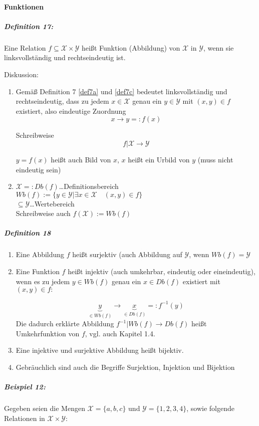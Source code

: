 \documentclass[a4paper]{scrartcl}
\begin{document}
\paragraph{Funktionen}
\subparagraph{Definition 17:} Eine Relation $f\subseteq \mathcal{X} \times \mathcal{Y}$ heißt Funktion (Abbildung) von $\mathcal{X}$ in $\mathcal{Y}$, wenn sie linksvollständig und rechtseindeutig ist.

Diskussion:
\begin{enumerate}
\item Gemäß Definition 7 \ref{def7a} und \ref{def7c} bedeutet linksvollständig und rechtseindeutig, dass zu jedem $x \in \mathcal{X}$ genau ein $y \in \mathcal{Y}$ mit $(x,y) \in f$ existiert, also eindeutige Zuordnung
\[x \rightarrow y =: f(x)\]

Schreibweise
\[ f| \mathcal{X} \rightarrow \mathcal{Y}\]

$y = f(x)$ heißt auch Bild von $x$,
$x$ heißt ein Urbild von $y$ (muss nicht eindeutig sein)
\item $\mathcal{X} =: Db(f)$\dots Definitionsbereich\\
$Wb(f):=\{y\in \mathcal{Y} | \exists x \in \mathcal{X} \quad (x,y) \in f\}$\\
$\subseteq \mathcal{Y}$\dots Wertebereich\\
Schreibweise auch $f(\mathcal{X}):= Wb(f)$
\end{enumerate}

\subparagraph{Definition 18}
\begin{enumerate}
\item Eine Abbildung $f$ heißt surjektiv (auch Abbildung auf $\mathcal{Y}$, wenn $Wb(f)=\mathcal{Y}$
\item Eine Funktion $f$ heißt injektiv (auch umkehrbar, eindeutig oder eineindeutig), wenn es zu jedem $y \in Wb(f)$ genau ein $x \in Db(f)$ existiert mit $(x,y) \in f:$

\[\underbrace{y}_{\in Wb(f)} \longrightarrow \underbrace{x}_{\in Db(f)} =: f^{-1}(y)\]
Die dadurch erklärte Abbildung $f^{-1}| Wb(f) \rightarrow Db(f)$ heißt Umkehrfunktion von $f$, vgl. auch Kapitel 1.4.
\item Eine injektive und surjektive Abbildung heißt bijektiv.
\item Gebräuchlich sind auch die Begriffe Surjektion, Injektion und Bijektion
\end{enumerate}

\subparagraph{Beispiel 12:} Gegeben seien die Mengen $\mathcal{X} = \{ a,b,c\}$ und $\mathcal{Y} = \{1,2,3,4\}$, sowie folgende Relationen in $\mathcal{X} \times \mathcal{Y}:$
\end{document}
